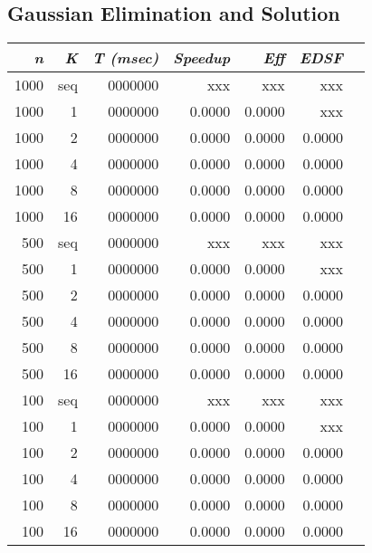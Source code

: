 \documentclass{dependencies/acm_proc_article-sp}
\begin{document}
\subsection{Gaussian Elimination and Solution}

\begin{center}
\begin{tabular}{|r|r|r|r|r|r|r|}\hline
{\em n} & {\em K} & {\em T (msec)} & {\em Speedup} & {\em Eff} & {\em EDSF} \\\hline
1000    & seq     & 0000000        &   xxx         & xxx       & xxx        \\\hline
1000    & 1       & 0000000        & 0.0000        & 0.0000    & xxx        \\\hline
1000    & 2       & 0000000        & 0.0000        & 0.0000    & 0.0000     \\\hline
1000    & 4       & 0000000        & 0.0000        & 0.0000    & 0.0000     \\\hline
1000    & 8       & 0000000        & 0.0000        & 0.0000    & 0.0000     \\\hline
1000    & 16      & 0000000        & 0.0000        & 0.0000    & 0.0000     \\\hline
500     & seq     & 0000000        &   xxx         & xxx       & xxx        \\\hline
500     & 1       & 0000000        & 0.0000        & 0.0000    & xxx        \\\hline
500     & 2       & 0000000        & 0.0000        & 0.0000    & 0.0000     \\\hline
500     & 4       & 0000000        & 0.0000        & 0.0000    & 0.0000     \\\hline
500     & 8       & 0000000        & 0.0000        & 0.0000    & 0.0000     \\\hline
500     & 16      & 0000000        & 0.0000        & 0.0000    & 0.0000     \\\hline
100     & seq     & 0000000        &   xxx         & xxx       & xxx        \\\hline
100     & 1       & 0000000        & 0.0000        & 0.0000    & xxx        \\\hline
100     & 2       & 0000000        & 0.0000        & 0.0000    & 0.0000     \\\hline
100     & 4       & 0000000        & 0.0000        & 0.0000    & 0.0000     \\\hline
100     & 8       & 0000000        & 0.0000        & 0.0000    & 0.0000     \\\hline
100     & 16      & 0000000        & 0.0000        & 0.0000    & 0.0000     \\\hline
\end{tabular}
\end{center}
\end{document}
